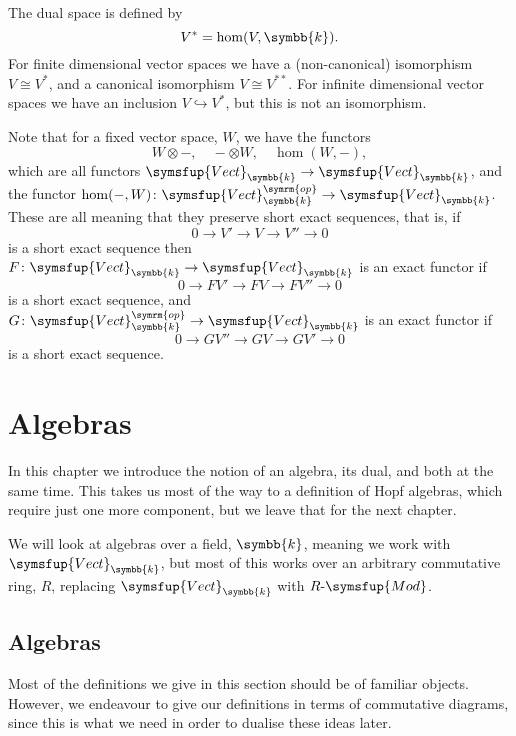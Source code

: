 \documentclass[fleqn]{NotesClass}
\makeatletter
\newcommand{\c@egory}[1]{\symsfup{#1}}
\newcommand{\Vect}[1][\field]{\c@egory{Vect}_{#1}}
\newcommand{\RMod}[1][R]{#1\text{-}\c@egory{Mod}}
\newcommand{\isomorphic}{\cong}
\renewcommand{\field}{\symbb{k}}
\newcommand{\op}{\symrm{op}}
\makeatother
\begin{document}
    The dual space is defined by
    \begin{equation}
        V^* = \hom(V, \field).
    \end{equation}
    For finite dimensional vector spaces we have a (non-canonical) isomorphism \(V \isomorphic V^*\), and a canonical isomorphism \(V \isomorphic V^{**}\).
    For infinite dimensional vector spaces we have an inclusion \(V \hookrightarrow V^*\), but this is not an isomorphism.
    
    Note that for a fixed vector space, \(W\), we have the functors
    \begin{equation}
        W \otimes -, \quad - \otimes W, \quad \hom(W, -),
    \end{equation}
    which are all functors \(\Vect \to \Vect\), and the functor \(\hom(-, W) \colon \Vect^{\op} \to \Vect\).
    These are all  meaning that they preserve short exact sequences, that is, if
    \begin{equation}
        0 \to V' \to V \to V'' \to 0
    \end{equation}
    is a short exact sequence then \(F \colon \Vect \to \Vect\) is an exact functor if
    \begin{equation}
        0 \to FV' \to FV \to FV'' \to 0
    \end{equation}
    is a short exact sequence, and \(G \colon \Vect^{\op} \to \Vect\) is an exact functor if
    \begin{equation}
        0 \to GV'' \to GV \to GV' \to 0
    \end{equation}
    is a short exact sequence.
    
    
    \chapter{Algebras}
    In this chapter we introduce the notion of an algebra, its dual, and both at the same time.
    This takes us most of the way to a definition of Hopf algebras, which require just one more component, but we leave that for the next chapter.
    
    We will look at algebras over a field, \(\field\), meaning we work with \(\Vect\), but most of this works over an arbitrary commutative ring, \(R\), replacing \(\Vect\) with \(\RMod\).
    
    \section{Algebras}
    Most of the definitions we give in this section should be of familiar objects.
    However, we endeavour to give our definitions in terms of commutative diagrams, since this is what we need in order to dualise these ideas later.
    
\end{document}
